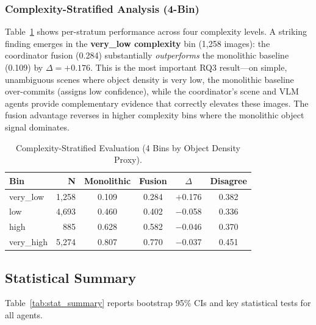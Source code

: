 \documentclass[12pt,onecolumn,a4paper]{IEEEtran}
\begin{document}
\subsubsection{Complexity-Stratified Analysis (4-Bin)}
Table~\ref{tab:complexity_5bin} shows per-stratum performance across four complexity levels. A striking finding emerges in the \textbf{very\_low complexity} bin (1,258 images): the coordinator fusion (0.284) substantially \textit{outperforms} the monolithic baseline (0.109) by $\Delta = +0.176$. This is the most important RQ3 result---on simple, unambiguous scenes where object density is very low, the monolithic baseline over-commits (assigns low confidence), while the coordinator's scene and VLM agents provide complementary evidence that correctly elevates these images. The fusion advantage reverses in higher complexity bins where the monolithic object signal dominates.

\begin{table}[!htbp]
\centering
\caption{Complexity-Stratified Evaluation (4 Bins by Object Density Proxy).}
\label{tab:complexity_5bin}
\begin{tabular}{lrcccc}
\toprule
Bin & N & Monolithic & Fusion & $\Delta$ & Disagree \\
\midrule
very\_low  & 1,258 & 0.109 & 0.284 & $+$0.176 & 0.382 \\
low        & 4,693 & 0.460 & 0.402 & $-$0.058 & 0.336 \\
high       &   885 & 0.628 & 0.582 & $-$0.046 & 0.370 \\
very\_high & 5,274 & 0.807 & 0.770 & $-$0.037 & 0.451 \\
\bottomrule
\end{tabular}
\end{table}

\subsection{Statistical Summary}
Table~\ref{tab:stat_summary} reports bootstrap 95\% CIs and key statistical tests for all agents.
\end{document}
